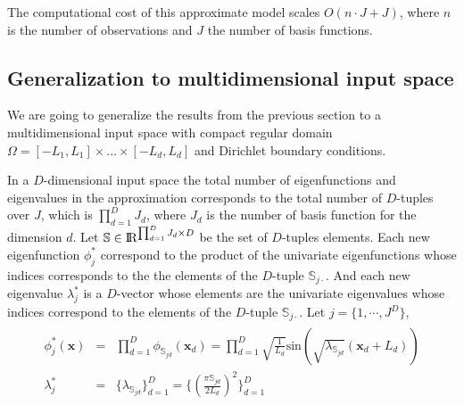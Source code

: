 \documentclass[]{interact}
\theoremstyle{plain}%
\theoremstyle{definition}
\theoremstyle{remark}
\begin{document}
The computational cost of this approximate model scales $O(n\cdot J+J)$, where $n$ is the number of observations and $J$ the number of basis functions.



\subsection{Generalization to multidimensional input space}

We are going to generalize the results from the previous section to a multidimensional input space with compact regular domain $\Omega=[-L_1,L_1] \times \dots \times [-L_d,L_d]$ and Dirichlet boundary conditions.  

\vspace{0.2cm}
In a $D$-dimensional input space the total number of eigenfunctions and eigenvalues in the approximation corresponds to the total number of $D$-tuples over $J$, which is $\prod_{d=1}^{D} J_d$, where $J_d$ is the number of basis function for the dimension $d$. Let $\mathbb{S}\in {\rm I\!R}^{\prod_{d=1}^{D} J_d \times D}$ be the set of $D$-tuples elements. Each new eigenfunction $\phi^{\ast}_j$ correspond to the product of the univariate eigenfunctions whose indices corresponds to the the elements of the $D$-tuple $\mathbb{S}_{j\cdotp}$. And each new eigenvalue $\lambda^{\ast}_j$ is a $D$-vector whose elements are the univariate eigenvalues whose indices correspond to the elements of the $D$-tuple $\mathbb{S}_{j\cdotp}$. Let $j=\{1,\cdots,J^D\}$,
%
\begin{eqnarray} \label{bf&lambda_multi}
\begin{split}
\phi^{\ast}_j(\mathbf{x}) &=& \prod_{d=1}^{D} \phi_{\mathbb{S}_{jd}}(\mathbf{x}_d) = \prod_{d=1}^{D} \sqrt{\frac{1}{L_d}} \text{sin}\left(\sqrt{\lambda_{\mathbb{S}_{jd}}}(\mathbf{x}_d+L_d)\right) \\
%
\lambda^{\ast}_j &=& \{\lambda_{\mathbb{S}_{jd}} \}_{d=1}^D =  \{ \left(\tfrac{\pi \mathbb{S}_{jd}}{2L_d}\right)^2 \}_{d=1}^D  
\end{split}
\end{eqnarray}
\end{document}
